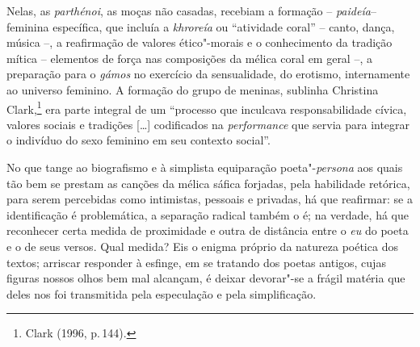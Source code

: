 Nelas, as \textit{parthénoi}, as moças não casadas, recebiam a formação -- \textit{paideía}-- feminina específica, que incluía a \textit{khroreía} ou ``atividade coral'' -- canto, dança, música --, a reafirmação de valores ético"-morais e o conhecimento da tradição mítica -- elementos de força nas composições da mélica coral em geral --, a preparação para o \textit{gámos} no exercício da sensualidade, do erotismo, internamente ao universo feminino. A formação do grupo de meninas, sublinha Christina Clark,\footnote{Clark (1996, p.\,144).} era parte integral de um “processo que inculcava responsabilidade cívica, valores sociais e tradições {[}\ldots{}{]} codificados na \textit{performance} que servia para integrar o indivíduo do sexo feminino em seu contexto social”.


No que tange ao biografismo e à simplista equiparação poeta"-\textit{persona} aos quais tão bem se prestam as canções da mélica sáfica forjadas, pela habilidade retórica, para serem percebidas como intimistas, pessoais e privadas, há que reafirmar: se a identificação é problemática,
a separação radical também o é; na verdade, há que reconhecer certa medida de
proximidade e outra de distância entre o \textit{eu} do poeta e o de seus versos. Qual
medida? Eis o enigma próprio da natureza poética dos textos; arriscar
responder à esfinge, em se tratando dos poetas antigos, cujas figuras nossos
olhos bem mal alcançam, é deixar devorar"-se a frágil matéria que deles nos foi
transmitida pela especulação e pela simplificação.

